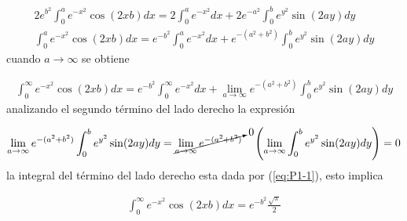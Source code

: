 \begin{gather*}
    2e^{b^2}\int_{0}^{a}e^{-x^2}\cos(2xb)dx = 2\int_{0}^{a}e^{-x^2}dx +  2e^{-a^2}\int_{0}^{b}e^{y^2}\sin(2ay)dy  \\
    \int_{0}^{a}e^{-x^2}\cos(2xb)dx = e^{-b^2}\int_{0}^{a}e^{-x^2}dx +  e^{-(a^2 + b^2)}\int_{0}^{b}e^{y^2}\sin(2ay)dy
\end{gather*}
cuando $a \rightarrow \infty$ se obtiene 

\begin{gather*}
    \int_{0}^{\infty}e^{-x^2}\cos(2xb)dx = e^{-b^2}\int_{0}^{\infty}e^{-x^2}dx +  \lim_{a\rightarrow\infty}e^{-(a^2 + b^2)}\int_{0}^{b}e^{y^2}\sin(2ay)dy
\end{gather*}
analizando el segundo término del lado derecho la expresión

\begin{gather*}
    \lim_{a\rightarrow\infty}e^{-(a^2 + b^2)}\int_{0}^{b}e^{y^2}\sin(2ay)dy = \cancelto{0}{\lim_{a\rightarrow\infty}e^{-(a^2 + b^2)}} \quad \left(\lim_{a\rightarrow\infty} \int_{0}^{b} e^{y^2}\sin(2ay)dy\right) = 0
\end{gather*}
la integral del término del lado derecho esta dada por (\ref*{eq:P1-1}), esto implica

\begin{mdframed}
    \vspace{-0.5cm}
    \begin{gather}
        \int_{0}^{\infty}e^{-x^2}\cos(2xb)dx = e^{-b^2}\frac{\sqrt{\pi}}{2}
    \end{gather}
\end{mdframed}
